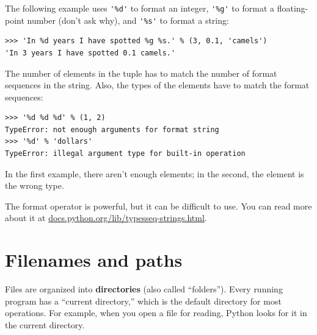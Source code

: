 \documentclass[10pt]{book}
\begin{document}
{The following example uses \verb"'%d'" to format an integer,
\verb"'%g'" to format
a floating-point number (don't ask why), and \verb"'%s'" to format
a string:

\beforeverb
\begin{verbatim}
>>> 'In %d years I have spotted %g %s.' % (3, 0.1, 'camels')
'In 3 years I have spotted 0.1 camels.'
\end{verbatim}
\afterverb
%
The number of elements in the tuple has to match the number
of format sequences in the string.  Also, the types of the
elements have to match the format sequences:


\beforeverb
\begin{verbatim}
>>> '%d %d %d' % (1, 2)
TypeError: not enough arguments for format string
>>> '%d' % 'dollars'
TypeError: illegal argument type for built-in operation
\end{verbatim}
\afterverb
%
In the first example, there aren't enough elements; in the
second, the element is the wrong type.

The format operator is powerful, but it can be difficult to use.  You
can read more about it at
\url{docs.python.org/lib/typesseq-strings.html}.




\section{Filenames and paths}
\label{paths}


Files are organized into {\bf directories} (also called ``folders'').
Every running program has a ``current directory,'' which is the
default directory for most operations.  
For example, when you open a file for reading, Python looks for it in the
current directory.


}
\end{document}
